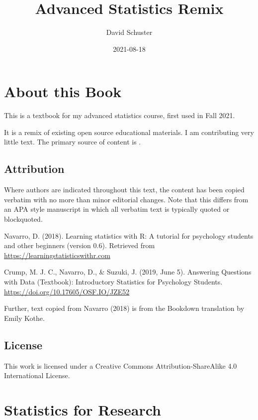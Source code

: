 \documentclass[
]{book}
\title{Advanced Statistics Remix}
\author{David Schuster}
\date{2021-08-18}
\begin{document}
\maketitle

{
\setcounter{tocdepth}{1}
\tableofcontents
}
\hypertarget{about-this-book}{%
\chapter*{About this Book}\label{about-this-book}}

This is a textbook for my advanced statistics course, first used in Fall 2021.

It is a remix of existing open source educational materials. I am contributing very little text. The primary source of content is \citet{Navarro2018}.

\hypertarget{attribution}{%
\section*{Attribution}\label{attribution}}

Where authors are indicated throughout this text, the content has been copied verbatim with no more than minor editorial changes. Note that this differs from an APA style manuscript in which all verbatim text is typically quoted or blockquoted.

Navarro, D. (2018). Learning statistics with R: A tutorial for psychology students and other beginners (version 0.6). Retrieved from \url{https://learningstatisticswithr.com}

Crump, M. J. C., Navarro, D., \& Suzuki, J. (2019, June 5). Answering Questions with Data (Textbook): Introductory Statistics for Psychology Students. \url{https://doi.org/10.17605/OSF.IO/JZE52}

Further, text copied from Navarro (2018) is from the Bookdown translation by Emily Kothe.

\hypertarget{license}{%
\section*{License}\label{license}}

This work is licensed under a Creative Commons Attribution-ShareAlike 4.0 International License.

\hypertarget{statistics-for-research}{%
\chapter{Statistics for Research}\label{statistics-for-research}}
\end{document}
